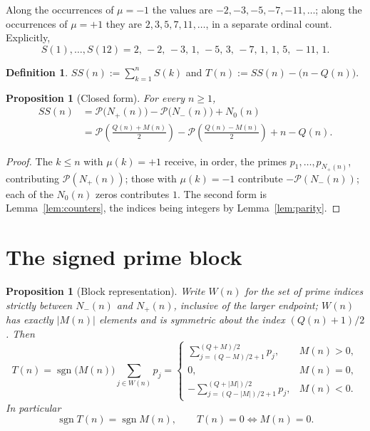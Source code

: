 \documentclass[11pt]{amsart}
\numberwithin{equation}{section}
\theoremstyle{plain}
\newtheorem{proposition}[theorem]{Proposition}
\theoremstyle{definition}
\newtheorem{definition}[theorem]{Definition}
\theoremstyle{remark}
\newcommand{\mob}{\mu}
\newcommand{\Mert}{M}
\newcommand{\Sq}{Q}
\newcommand{\PS}{\mathcal P}
\begin{document}
Along the occurrences of $\mob=-1$ the values are $-2,-3,-5,-7,-11,\ldots$; along
the occurrences of $\mob=+1$ they are $2,3,5,7,11,\ldots$, in a separate ordinal
count. Explicitly,
\begin{equation}
\label{eq:first-transform-values}
S(1),\ldots,S(12)=2,\,-2,\,-3,\,1,\,-5,\,3,\,-7,\,1,\,1,\,5,\,-11,\,1 .
\end{equation}

\begin{definition}
\label{def:ss-t}
$SS(n):=\sum_{k=1}^{n}S(k)$ and $T(n):=SS(n)-\bigl(n-\Sq(n)\bigr)$.
\end{definition}

\begin{proposition}[Closed form]\label{prop:closed}
For every $n\ge1$,
\begin{equation}
\label{eq:closed-form}
\boxed{\begin{aligned}
SS(n)&=\PS\bigl(N_+(n)\bigr)-\PS\bigl(N_-(n)\bigr)+N_0(n)\\
&=\PS\!\left(\frac{\Sq(n)+\Mert(n)}2\right)
-\PS\!\left(\frac{\Sq(n)-\Mert(n)}2\right)+n-\Sq(n).
\end{aligned}}
\end{equation}
\end{proposition}

\begin{proof}
The $k\le n$ with $\mob(k)=+1$ receive, in order, the primes
$p_1,\dots,p_{N_+(n)}$, contributing $\PS(N_+(n))$; those with $\mob(k)=-1$
contribute $-\PS(N_-(n))$; each of the $N_0(n)$ zeros contributes $1$. The
second form is Lemma~\ref{lem:counters}, the indices being integers by
Lemma~\ref{lem:parity}.
\end{proof}

\section{The signed prime block}
\label{sec:block}

\begin{proposition}[Block representation]\label{prop:block}
Write $W(n)$ for the set of prime indices strictly between $N_-(n)$ and
$N_+(n)$, inclusive of the larger endpoint; $W(n)$ has exactly $|\Mert(n)|$
elements and is symmetric about the index $(\Sq(n)+1)/2$. Then
\begin{equation}
\label{eq:block-representation}
T(n)=\operatorname{sgn}\bigl(\Mert(n)\bigr)\sum_{j\in W(n)}p_j
=
\begin{cases}
\displaystyle\sum_{j=(\Sq-\Mert)/2+1}^{(\Sq+\Mert)/2}p_j, & \Mert(n)>0,\\[5mm]
0,& \Mert(n)=0,\\[2mm]
\displaystyle-\sum_{j=(\Sq-|\Mert|)/2+1}^{(\Sq+|\Mert|)/2}p_j, & \Mert(n)<0 .
\end{cases}
\end{equation}
In particular
\begin{equation}
\label{eq:block-sign}
\operatorname{sgn}T(n)=\operatorname{sgn}\Mert(n),
\qquad
T(n)=0\iff \Mert(n)=0 .
\end{equation}
\end{proposition}
\end{document}
